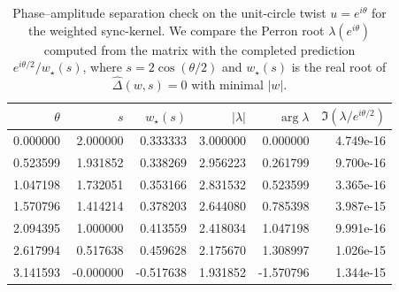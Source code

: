 \begin{table}[H]
\centering
\scriptsize
\setlength{\tabcolsep}{6pt}
\caption{Phase--amplitude separation check on the unit-circle twist $u=e^{i\theta}$ for the weighted sync-kernel. We compare the Perron root $\lambda(e^{i\theta})$ computed from the matrix with the completed prediction $e^{i\theta/2}/w_\star(s)$, where $s=2\cos(\theta/2)$ and $w_\star(s)$ is the real root of $\widehat\Delta(w,s)=0$ with minimal $|w|$.}
\label{tab:sync_kernel_weighted_phase_amplitude}
\begin{tabular}{r r r r r r}
\toprule
$\theta$ & $s$ & $w_\star(s)$ & $|\lambda|$ & $\arg\lambda$ & $\Im(\lambda/e^{i\theta/2})$\\
\midrule
0.000000 & 2.000000 & 0.333333 & 3.000000 & 0.000000 & 4.749e-16\\
0.523599 & 1.931852 & 0.338269 & 2.956223 & 0.261799 & 9.700e-16\\
1.047198 & 1.732051 & 0.353166 & 2.831532 & 0.523599 & 3.365e-16\\
1.570796 & 1.414214 & 0.378203 & 2.644080 & 0.785398 & 3.987e-15\\
2.094395 & 1.000000 & 0.413559 & 2.418034 & 1.047198 & 9.991e-16\\
2.617994 & 0.517638 & 0.459628 & 2.175670 & 1.308997 & 1.026e-15\\
3.141593 & -0.000000 & -0.517638 & 1.931852 & -1.570796 & 1.344e-15\\
\bottomrule
\end{tabular}
\end{table}
